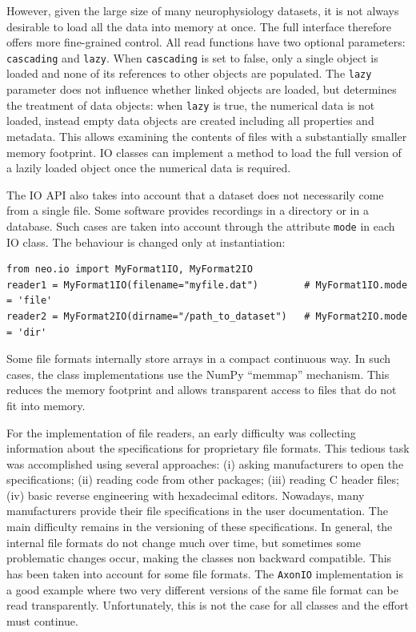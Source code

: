 \documentclass{frontiers}
\begin{document}
However, given the large size of many neurophysiology datasets, it is not always desirable to load all the data into memory at once. The full interface therefore offers more fine-grained control.
All read functions have two optional parameters: \lstinline`cascading` and \lstinline`lazy`.
When \lstinline`cascading` is set to false, only a single object is loaded and none of its references to other objects are populated.
The \lstinline`lazy` parameter does not influence whether linked objects are loaded, but determines the treatment of data objects: when \lstinline`lazy` is true, the numerical data is not loaded, instead empty data objects are created including all properties and metadata. This allows examining the contents of files with a substantially smaller memory footprint. IO classes can implement a method to load the full version of a lazily loaded object once the numerical data is required.

The IO API also takes into account that a dataset does not necessarily come from a single file. Some software provides recordings in a directory or in a database. Such cases are taken into account through the attribute \lstinline`mode` in each IO class. The behaviour is changed only at instantiation:

\begin{lstlisting}[style=display]
from neo.io import MyFormat1IO, MyFormat2IO
reader1 = MyFormat1IO(filename="myfile.dat")        # MyFormat1IO.mode = 'file'
reader2 = MyFormat2IO(dirname="/path_to_dataset")   # MyFormat2IO.mode = 'dir'
\end{lstlisting}

Some file formats internally store arrays in a compact continuous way. In such cases, the class implementations use the NumPy ``memmap'' mechanism. This reduces the memory footprint and allows transparent access to files that do not fit into memory.

For the implementation of file readers, an early difficulty was collecting information about the specifications for proprietary file formats. This tedious task was accomplished using several approaches: (i) asking manufacturers to open the specifications; (ii) reading code from other packages; (iii) reading C header files; (iv) basic reverse engineering with hexadecimal editors. Nowadays, many manufacturers provide their file specifications in the user documentation.
The main difficulty remains in the versioning of these specifications. In general, the internal file formats do not change much over time, but sometimes some problematic changes occur, making the classes non backward compatible. This has been taken into account for some file formats. The \lstinline`AxonIO` implementation is a good example where two very different versions of the same file format can be read transparently. Unfortunately, this is not the case for all classes and the effort must continue.
\end{document}
